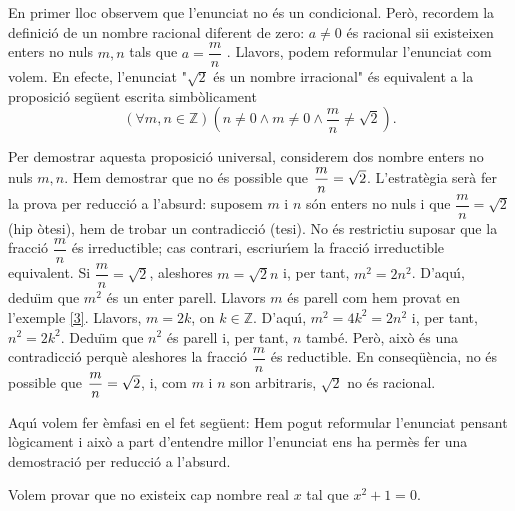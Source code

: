 \begin{solucio}
En primer lloc observem que l'enunciat no \'{e}s un condicional. Per\`{o},
recordem la definici\'{o} de un nombre racional diferent de zero: $a\neq0$
\'{e}s racional sii existeixen enters no nuls $m,n$ tals que $a=\dfrac{m}{n}$%
. Llavors, podem reformular l'enunciat com volem. En efecte, l'enunciat "$%
\sqrt{2}$ \'{e}s un nombre irracional" \'{e}s equivalent a la proposici\'{o}
seg\"{u}ent escrita simb\`{o}licament
\begin{equation*}
\left( \forall m,n\in\mathbb{Z}\right) \left( n\neq0\wedge m\neq 0\wedge%
\frac{m}{n}\neq\sqrt{2}\right) .
\end{equation*}

Per demostrar aquesta proposici\'{o} universal, considerem dos nombre enters
no nuls $m,n$. Hem demostrar que no \'{e}s possible que $\dfrac{m}{n}=\sqrt {%
2}$. L'estrat\`{e}gia ser\`{a} fer la prova per reducci\'{o} a l'absurd:
suposem $m$ i $n$ s\'{o}n enters no nuls i que $\dfrac{m}{n}=\sqrt{2}$ (hip%
\`{o}tesi), hem de trobar un contradicci\'{o} (tesi). No \'{e}s restrictiu
suposar que la fracci\'{o} $\dfrac{m}{n}$ \'{e}s irreductible; cas contrari,
escriur\'{\i}em la fracci\'{o} irreductible equivalent. Si $\dfrac{m}{n}=%
\sqrt{2}$, aleshores $m=\sqrt{2}n$ i, per tant, $m^{2}=2n^{2}$. D'aqu\'{\i},
dedu\"{\i}m que $m^{2}$ \'{e}s un enter parell. Llavors $m$ \'{e}s parell
com hem provat en l'exemple \ref{3}. Llavors, $m=2k$, on $k\in\mathbb{Z}$.
D'aqu\'{\i}, $m^{2}=4k^{2}=2n^{2}$ i, per tant, $n^{2}=2k^{2}$. Dedu\"{\i}m
que $n^{2}$ \'{e}s parell i, per tant, $n$ tamb\'{e}. Per\`{o}, aix\`{o}
\'{e}s una contradicci\'{o} perqu\`{e} aleshores la fracci\'{o} $\dfrac{m}{n}
$ \'{e}s reductible. En conseq\"{u}\`{e}ncia, no \'{e}s possible que $\dfrac{%
m}{n}=\sqrt{2}$, i, com $m$ i $n$ son arbitraris, $\sqrt{2}$ no \'{e}s
racional.

Aqu\'{\i} volem fer \`{e}mfasi en el fet seg\"{u}ent: Hem pogut reformular
l'enunciat pensant l\`{o}gicament i aix\`{o} a part d'entendre millor
l'enunciat ens ha perm\`{e}s fer una demostraci\'{o} per reducci\'{o} a
l'absurd.
\end{solucio}

\begin{exem}
Volem provar que no existeix cap nombre real $x$ tal que $x^{2}+1=0$.
\end{exem}

